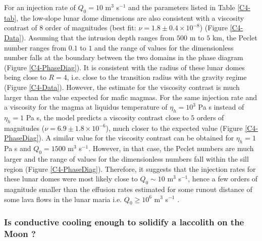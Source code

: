 For an injection rate of  $Q_0=10$ m$^{3}$ s$^{-1}$ and the parameters
listed in Table \ref{C4-tab}, the  low-slope lunar dome dimensions are
also consistent with  a viscosity contrast of $8$  order of magnitudes
(best    fit:   $\nu=1.8    \pm   0.4    \times   10^{-8}$)    (Figure
\ref{C4-Data}). Assuming that the intrusion  depth ranges from $500$ m
to $5$ km, the Peclet number ranges from $0.1$ to $1$ and the range of
values for the dimensionless number  falls at the boundary between the
two domains in  the phase diagram (Figure  \ref{C4-PhaseDiag}).  It is
consistent with the radius of these  lunar domes being close to $R=4$,
i.e.  close to  the transition radius with the  gravity regime (Figure
\ref{C4-Data}).  However,  the estimate for the  viscosity contrast is
much larger  than the value  expected for  mafic magmas. For  the same
injection rate and  a viscosity for the magma  at liquidus temperature
of $\eta_h=10^3$ Pa s instead of $\eta_h=1$ Pa s, the model predicts a
viscosity    contrast   close    to   $5$    orders   of    magnitudes
($\nu = 6.9 \pm 1.8 \times10^{-6}$), much closer to the expected value
(Figure  \ref{C4-PhaseDiag}).   A  similar  value  for  the  viscosity
contrast  can be  obtained for  $\eta_h=1$ Pa  s and  $Q_0=1500$ m$^3$
s$^{-1}$. However,  in that case,  the Peclet numbers are  much larger
and the range of values for  the dimensionless numbers fall within the
sill region  (Figure \ref{C4-PhaseDiag}). Therefore, it  suggests that
the injection  rates for these lunar  domes were most likely  close to
$Q_0\sim 10$ m$^{3}$ s$^{-1}$, hence a few orders of magnitude smaller
than the  effusion rates  estimated for some  runout distance  of some
lava  flows in  the lunar  maria  i.e.  $Q_0\ge  10^6$ m$^3$  s$^{-1}$
\citep{TracyKPGregg:1996wp}.

\subsubsection*{Is conductive  cooling enough to solidify  a laccolith
  on the Moon ?}
\label{sec:visc-contr-lunar}

